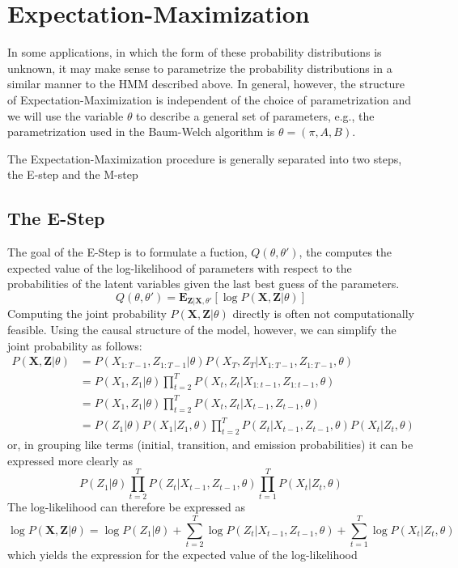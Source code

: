 \documentclass{amsart}
\theoremstyle{definition}
\theoremstyle{remark}
\numberwithin{equation}{section}
\begin{document}
\section{Expectation-Maximization}
In some applications, in which the form of these probability distributions is unknown, it may make sense to parametrize the probability distributions in a similar manner to the HMM described above. In general, however, the structure of Expectation-Maximization is independent of the choice of parametrization and we will use the variable $\theta$ to describe a general set of parameters, e.g., the parametrization used in the Baum-Welch algorithm is $\theta = (\pi,A,B)$.

The Expectation-Maximization procedure is generally separated into two steps, the E-step and the M-step

\subsection*{The E-Step}
The goal of the E-Step is to formulate a fuction, $Q(\theta, \theta')$, the computes the expected value of the log-likelihood of parameters with respect to the probabilities of the latent variables given the last best guess of the parameters.
\[
Q(\theta,\theta') = \textbf{E}_{\textbf{Z}|\textbf{X},\theta'} \left[\log{P(\textbf{X},\textbf{Z}|\theta)}\right]
\]
Computing the joint probability $P(\textbf{X},\textbf{Z}|\theta)$ directly is often not computationally feasible. Using the causal structure of the model, however, we can simplify the joint probability as follows:
\begin{align*}
P(\textbf{X},\textbf{Z}|\theta) &= P(X_{1:T-1},Z_{1:T-1}|\theta)P(X_T,Z_T|X_{1:T-1},Z_{1:T-1},\theta)\\
&= P(X_1,Z_1|\theta)\prod_{t=2}^T P(X_t,Z_t|X_{1:t-1}, Z_{1:t-1},\theta)\\
&= P(X_1,Z_1|\theta)\prod_{t=2}^T P(X_t,Z_t|X_{t-1}, Z_{t-1},\theta)\\
&= P(Z_1|\theta)P(X_1|Z_1,\theta)\prod_{t=2}^T P(Z_t|X_{t-1}, Z_{t-1},\theta) P(X_t|Z_t,\theta)
\end{align*}
or, in grouping like terms (initial, transition, and emission probabilities) it can be expressed more clearly as
\[
P(Z_1|\theta)\prod_{t=2}^T P(Z_t|X_{t-1}, Z_{t-1},\theta) \prod_{t=1}^T P(X_t|Z_t,\theta)
\]
The log-likelihood can therefore be expressed as
\[\log{P(\textbf{X},\textbf{Z}|\theta)} = \log P(Z_1|\theta) + \sum_{t=2}^T \log P(Z_t|X_{t-1}, Z_{t-1},\theta) + \sum_{t=1}^T \log P(X_t|Z_t,\theta)\]
which yields the expression for the expected value of the log-likelihood
\end{document}
